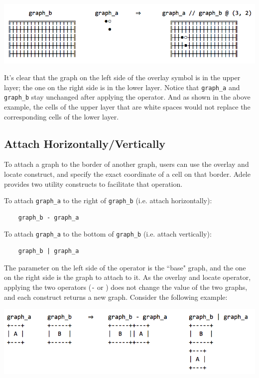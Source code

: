 \documentclass[11pt,letterpaper]{article}
\begin{document}
\includegraphics[width=\textwidth]{./graph_01.png}

It's clear that the graph on the left side of the overlay symbol is in the upper layer; the one on the right side is in the lower layer. Notice that \texttt{graph\_a} and \texttt{graph\_b} stay unchanged after applying the operator. And as shown in the above example, the cells of the upper layer that are white spaces would not replace the corresponding cells of the lower layer.

\subsection {Attach Horizontally/Vertically}

To attach a graph to the border of another graph, users can use the overlay and locate construct, and specify the exact coordinate of a cell on that border. Adele provides two utility constructs to facilitate that operation.

To attach \texttt{graph\_a} to the right of \texttt{graph\_b} (i.e. attach horizontally):
\begin{lstlisting}
    graph_b - graph_a
\end{lstlisting}

To attach \texttt{graph\_a} to the bottom of \texttt{graph\_b} (i.e. attach vertically):
\begin{lstlisting}
    graph_b | graph_a
\end{lstlisting}

The parameter on the left side of the operator is the ``base" graph, and the one on the right side is the graph to attach to it. As the overlay and locate operator, applying the two operators (\texttt{-} or \texttt{\textbar}) does not change the value of the two graphs, and each construct returns a new graph. Consider the following example:

\includegraphics[width=\textwidth]{./graph_02.png}
\end{document}
